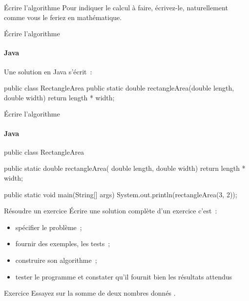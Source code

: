 \begin{hideedit}
\begin{frame}{Écrire l'algorithme}
{  Pour indiquer le calcul à faire, écrivez-le, naturellement comme
  vous le feriez en mathématique.  
  }
\end{frame}

\begin{frame}[fragile]{Écrire l'algorithme}
  \framesubtitle{Java}

  Une solution en Java s'écrit~:
\begin{java}
public class RectangleArea {
  public static double rectangleArea(double length, double width) {
    return length * width;
  }
}
\end{java}
\end{frame}

\begin{frame}[fragile]{Écrire l'algorithme}
  \framesubtitle{Java}
\begin{java}
public class RectangleArea {
  public static double rectangleArea(
      double length, double width) {
    return length * width;
  }

  public static void main(String[] args) {
    System.out.println(rectangleArea(3, 2));
  }
}
\end{java}
\end{frame}

\begin{frame}{Résoudre un exercice}
  Écrire une solution complète d'un exercice c'est~:
  \begin{itemize}
    \item spécifier le problème~;
    \item fournir des exemples, les tests~;
    \item construire son algorithme~;
    \item tester le programme et constater qu'il fournit bien les 
      résultats attendus
  \end{itemize}

  \pause
  \begin{block}{Exercice}
    Essayez sur \og la somme de deux nombres donnés \fg.
  \end{block}
\end{frame}


\end{hideedit}
